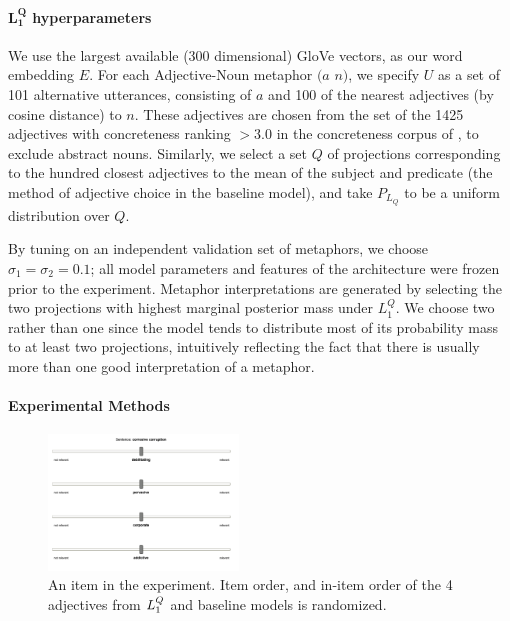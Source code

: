 \documentclass[9pt,twocolumn,twoside,lineno]{pnas-new}
\newcommand{\Listener}{L}
\newcommand{\QLONE}{\Listener_{{1}}^{{Q}}}
\begin{document}
{	%



	\paragraph{$\mathbf{\QLONE}$ hyperparameters}

		We use the largest available (300 dimensional) GloVe vectors, as our word embedding $E$. For each Adjective-Noun metaphor $(a$ $n)$, we specify $U$ as a set of 101 alternative utterances, consisting of $a$ and 100 of the nearest adjectives (by cosine distance) to $n$. These adjectives are chosen from the set of the 1425 adjectives with concreteness ranking $>3.0$ in the concreteness corpus of \cite{brysbaert2014concreteness}, to exclude abstract nouns.
		Similarly, we select a set $Q$ of projections corresponding to the hundred closest adjectives to the mean of the subject and predicate (the method of adjective choice in the baseline model), and take $P_{L_Q}$ to be a uniform distribution over $Q$. 

		By tuning on an independent validation set of metaphors, we choose $\sigma_1=\sigma_2=0.1$; all model parameters and features of the architecture were frozen prior to the experiment. Metaphor interpretations are generated by selecting the two projections with highest marginal posterior mass under $\QLONE$. We choose two rather than one since the model tends to distribute most of its probability mass to at least two projections, intuitively reflecting the fact that there is usually more than one good interpretation of a metaphor.

\paragraph{Experimental Methods}

\begin{figure}
\centering
\includegraphics[width=0.45\textwidth]{images/slide.png}
\caption{An item in the experiment. Item order, and in-item order of the 4 adjectives from $\protect\QLONE$ and baseline models is randomized.}
\label{fig:slide}
\end{figure}

}
\end{document}
